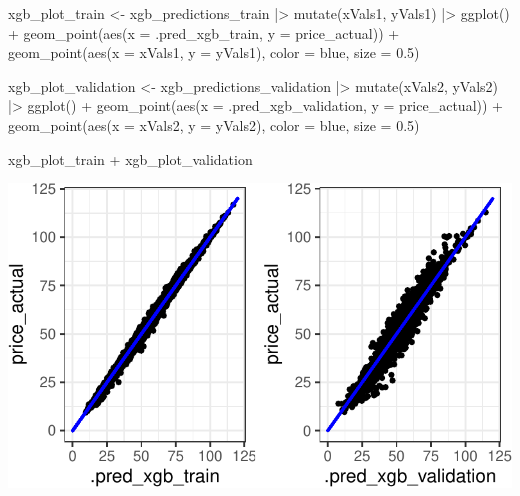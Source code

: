\documentclass[
]{article}
\newenvironment{Shaded}{\begin{snugshade}}{\end{snugshade}}
\newcommand{\AttributeTok}[1]{\textcolor[rgb]{0.40,0.45,0.13}{#1}}
\newcommand{\FloatTok}[1]{\textcolor[rgb]{0.68,0.00,0.00}{#1}}
\newcommand{\FunctionTok}[1]{\textcolor[rgb]{0.28,0.35,0.67}{#1}}
\newcommand{\NormalTok}[1]{\textcolor[rgb]{0.00,0.23,0.31}{#1}}
\newcommand{\OtherTok}[1]{\textcolor[rgb]{0.00,0.23,0.31}{#1}}
\newcommand{\SpecialCharTok}[1]{\textcolor[rgb]{0.37,0.37,0.37}{#1}}
\newcommand{\StringTok}[1]{\textcolor[rgb]{0.13,0.47,0.30}{#1}}
\begin{document}
\begin{Shaded}
\begin{Highlighting}[]
\NormalTok{xgb\_plot\_train }\OtherTok{\textless{}{-}}\NormalTok{ xgb\_predictions\_train }\SpecialCharTok{|\textgreater{}}
  \FunctionTok{mutate}\NormalTok{(xVals1, yVals1) }\SpecialCharTok{|\textgreater{}}
  \FunctionTok{ggplot}\NormalTok{() }\SpecialCharTok{+}
  \FunctionTok{geom\_point}\NormalTok{(}\FunctionTok{aes}\NormalTok{(}\AttributeTok{x =}\NormalTok{ .pred\_xgb\_train, }\AttributeTok{y =}\NormalTok{ price\_actual)) }\SpecialCharTok{+}
  \FunctionTok{geom\_point}\NormalTok{(}\FunctionTok{aes}\NormalTok{(}\AttributeTok{x =}\NormalTok{ xVals1, }\AttributeTok{y =}\NormalTok{ yVals1), }\AttributeTok{color =} \StringTok{\textquotesingle{}blue\textquotesingle{}}\NormalTok{, }\AttributeTok{size =} \FloatTok{0.5}\NormalTok{)}

\NormalTok{xgb\_plot\_validation }\OtherTok{\textless{}{-}}\NormalTok{ xgb\_predictions\_validation }\SpecialCharTok{|\textgreater{}}
  \FunctionTok{mutate}\NormalTok{(xVals2, yVals2) }\SpecialCharTok{|\textgreater{}}
  \FunctionTok{ggplot}\NormalTok{() }\SpecialCharTok{+}
  \FunctionTok{geom\_point}\NormalTok{(}\FunctionTok{aes}\NormalTok{(}\AttributeTok{x =}\NormalTok{ .pred\_xgb\_validation, }\AttributeTok{y =}\NormalTok{ price\_actual)) }\SpecialCharTok{+}
  \FunctionTok{geom\_point}\NormalTok{(}\FunctionTok{aes}\NormalTok{(}\AttributeTok{x =}\NormalTok{ xVals2, }\AttributeTok{y =}\NormalTok{ yVals2), }\AttributeTok{color =} \StringTok{\textquotesingle{}blue\textquotesingle{}}\NormalTok{, }\AttributeTok{size =} \FloatTok{0.5}\NormalTok{)}

\NormalTok{xgb\_plot\_train }\SpecialCharTok{+}\NormalTok{ xgb\_plot\_validation}
\end{Highlighting}
\end{Shaded}

\includegraphics{Analytics_Report_files/figure-pdf/plotXgb-1.pdf}
\end{document}
